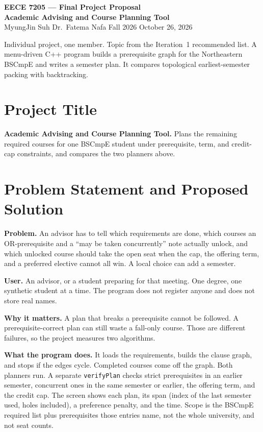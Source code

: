 \documentclass[10pt]{article}
\begin{document}
{\large\bfseries EECE 7205 --- Final Project Proposal}\\[0.15em]
{\bfseries Academic Advising and Course Planning Tool}\\[0.2em]
MyungJin Suh \quad\textbar\quad Dr.\ Fatema Nafa \quad\textbar\quad Fall 2026 \quad\textbar\quad October 26, 2026

\vspace{0.25em}
Individual project, one member. Topic from the Iteration~1 recommended list.
A menu-driven C++ program builds a prerequisite graph for the Northeastern
BSCmpE and writes a semester plan. It compares topological earliest-semester
packing with backtracking.

\section{Project Title}

\textbf{Academic Advising and Course Planning Tool.}
Plans the remaining required courses for one BSCmpE student under prerequisite,
term, and credit-cap constraints, and compares the two planners above.

\section{Problem Statement and Proposed Solution}

\textbf{Problem.} An advisor has to tell which requirements are done, which
courses an OR-prerequisite and a ``may be taken concurrently'' note actually
unlock, and which unlocked course should take the open seat when the cap, the
offering term, and a preferred elective cannot all win. A local choice can add
a semester.

\textbf{User.} An advisor, or a student preparing for that meeting. One degree,
one synthetic student at a time. The program does not register anyone and does
not store real names.

\textbf{Why it matters.} A plan that breaks a prerequisite cannot be followed.
A prerequisite-correct plan can still waste a fall-only course. Those are
different failures, so the project measures two algorithms.

\textbf{What the program does.} It loads the requirements, builds the clause
graph, and stops if the edges cycle. Completed courses come off the graph.
Both planners run. A separate \texttt{verifyPlan} checks strict prerequisites
in an earlier semester, concurrent ones in the same semester or earlier, the
offering term, and the credit cap. The screen shows each plan, its span (index
of the last semester used, holes included), a preference penalty, and the time.
Scope is the BSCmpE required list plus prerequisites those entries name, not
the whole university, and not seat counts.
\end{document}

